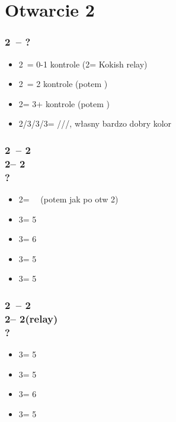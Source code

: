 \documentclass[12pt, a4paper]{report}
\begin{document}
\section*{\colorbox{blue!30}{Otwarcie 2\clubs}}
 {

    \subsubsection*{2\clubs\ -- ?}
    \begin{itemize}
        \item 2\diams\ = 0-1 kontrole (2\hearts = Kokish relay)
        \item 2\hearts\ = 2 kontrole (potem \nat)
        \item 2\spades = 3+ kontrole (potem \nat)
        \item 2\nt/3\clubs/3\diams/3\hearts = \clubs/\diams/\hearts/\spades, własny bardzo dobry kolor
    \end{itemize}

    \subsubsection*{2\clubs\ -- 2\diams\\
                2\hearts -- 2\spades\\
                ?}
    \begin{itemize}
        \item 2\nt = \nf\ \bal\ (potem jak po otw 2\nt)
        \item 3\clubs = 5\diams
        \item 3\diams = 6\hearts
        \item 3\hearts = 5\spades
        \item 3\spades = 5\clubs
    \end{itemize}

    \subsubsection*{2\clubs\ -- 2\diams\\
                2\spades -- 2\nt (relay)\\
                ?}
    \begin{itemize}
        \item 3\clubs = 5\diams
        \item 3\diams = 5\hearts
        \item 3\hearts = 6\spades
        \item 3\spades = 5\clubs
    \end{itemize}

}
\end{document}
